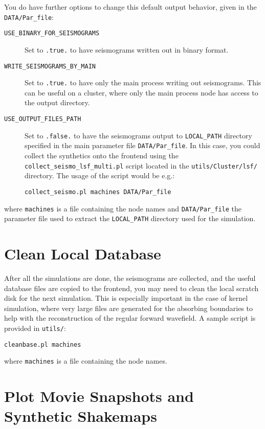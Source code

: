 You do have further options to change this default output behavior,
given in the \texttt{DATA/Par\_file}:
\begin{description}
\item [{\texttt{USE\_BINARY\_FOR\_SEISMOGRAMS}}] Set to \texttt{.true.} to have seismograms
written out in binary format.
\item [{\texttt{WRITE\_SEISMOGRAMS\_BY\_MAIN}}] Set to \texttt{.true.}
to have only the main process writing out seismograms. This can
be useful on a cluster, where only the main process node has access
to the output directory.
\item [{\texttt{USE\_OUTPUT\_FILES\_PATH}}] Set to \texttt{.false.} to
have the seismograms output to \texttt{LOCAL\_PATH} directory specified
in the main parameter file \texttt{DATA/Par\_file}. In this case,
you could collect the synthetics onto the frontend using the \texttt{collect\_seismo\_lsf\_multi.pl}
script located in the \texttt{utils/Cluster/lsf/} directory. The usage
of the script would be e.g.:

\begin{verbatim}
collect_seismo.pl machines DATA/Par_file
\end{verbatim}

\end{description}

where \texttt{machines} is a file containing the node names and \texttt{DATA/Par\_file}
the parameter file used to extract the \texttt{LOCAL\_PATH} directory
used for the simulation.


\section{Clean Local Database}

After all the simulations are done, the seismograms are collected,
and the useful database files are copied to the frontend, you may
need to clean the local scratch disk for the next simulation. This
is especially important in the case of kernel simulation, where very
large files are generated for the absorbing boundaries to help with
the reconstruction of the regular forward wavefield. A sample script
is provided in \texttt{utils/}:
\begin{verbatim}
cleanbase.pl machines
\end{verbatim}
where \texttt{machines} is a file containing the node names.


\section{Plot Movie Snapshots and Synthetic Shakemaps}



